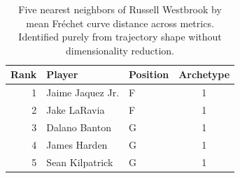 \begin{table}[htbp]
  \centering\small
  \begin{tabular}{rllc}
    \toprule
    Rank & Player & Position & Archetype \\
    \midrule
    1 & Jaime Jaquez Jr. & F & 1 \\
    2 & Jake LaRavia & F & 1 \\
    3 & Dalano Banton & G & 1 \\
    4 & James Harden & G & 1 \\
    5 & Sean Kilpatrick & G & 1 \\
    \bottomrule
  \end{tabular}
  \caption{Five nearest neighbors of Russell Westbrook by mean Fr\'{e}chet curve distance across metrics. Identified purely from trajectory shape without dimensionality reduction.}
  \label{tab:Russell_Westbrook_frechet_curve_neighbors}
\end{table}

